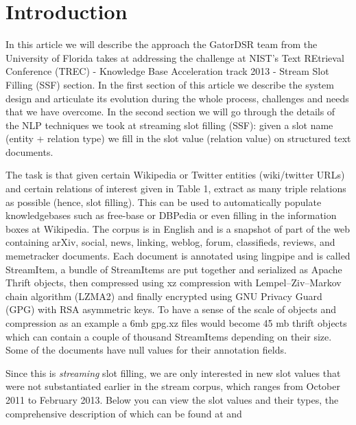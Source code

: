 
\section{Introduction}

In this article we will describe the approach the GatorDSR team from the 
University of Florida takes at addressing the challenge at NIST’s Text 
REtrieval Conference (TREC) - Knowledge Base Acceleration track 2013 - Stream 
Slot Filling (SSF) section. In the first section of this article we describe 
the system design and articulate its evolution during the whole process, 
challenges and needs that we have overcome. In the second section we will go 
through the details of the NLP techniques we took at streaming slot filling
(SSF): given a slot name (entity + relation type) we fill in the slot value
(relation value) on structured text documents.

The task is that given certain Wikipedia or Twitter entities 
(wiki/twitter URLs) and certain relations of interest given in Table 1, 
extract as many triple relations as possible (hence, slot filling). This can 
be used to automatically populate knowledgebases such as free-base or DBPedia 
or even filling in the information boxes at Wikipedia. The corpus is in 
English and is a snapshot of part of the web containing arXiv, social, news, 
linking, weblog, forum, classifieds, reviews, and memetracker documents. Each 
document is annotated using lingpipe and is called StreamItem, a bundle of 
StreamItems are put together and serialized as Apache Thrift objects, then 
compressed using xz compression with Lempel–Ziv–Markov chain algorithm (LZMA2) 
and finally encrypted using GNU Privacy Guard (GPG) with RSA asymmetric keys.
To have a sense of the scale of objects and compression as an example a 6mb
gpg.xz files would become 45 mb thrift objects which can contain a couple of 
thousand StreamItems depending on their size. Some of the documents have null 
values for their annotation fields.

Since this is \textit{streaming} slot filling, we are only interested in new 
slot values that were not substantiated earlier in the stream corpus, which 
ranges from October 2011 to February 2013. Below you can view the slot values 
and their types, the comprehensive description of which can be found at
\cite{tackbp} and \cite{aec} 

